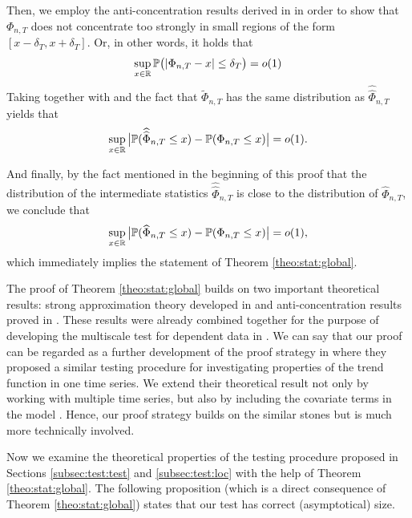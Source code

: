 \documentclass[a4paper,12pt]{article}
\makeatletter
\renewcommand{\eqref}[1]{\tagform@{\ref{#1}}}
\newcommand{\doublehattwo}[1]{\widehat{\widehat{#1}}}
\makeatother
\begin{document}
Then, we employ the anti-concentration results derived in \cite{Chernozhukov2015} in order to show that $\Phi_{n,T}$ does not concentrate too strongly in small regions of the form $[x-\delta_T,x+\delta_T]$. Or, in other words, it holds that 
\begin{align}\label{eq:proof2}
\sup_{x \in \mathbb{R}} \mathbb{P} \big( | \Phi_{n,T} - x | \le \delta_T \big) = o(1)
\end{align}
Taking \eqref{eq:proof1} together with \eqref{eq:proof2} and the fact that $\widetilde{\Phi}_{n, T}$ has the same distribution as $\doublehattwo{\Phi}_{n, T}$ yields that 
\begin{equation*}
\sup_{x \in \reals} \big| \pr(\doublehattwo{\Phi}_{n, T} \le x) - \pr(\Phi_{n,T} \le x) \big| = o(1). 
\end{equation*}
 
And finally, by the fact mentioned in the beginning of this proof that the distribution of the intermediate statistics $\doublehattwo{\Phi}_{n, T}$ is close to the distribution of $\widehat{\Phi}_{n, T}$, we conclude that 
\begin{equation*}
\sup_{x \in \mathbb{R}} \big| \mathbb{P}(\widehat{\Phi}_{n, T} \le x) - \mathbb{P}(\Phi_{n,T} \le x) \big| = o(1),
\end{equation*}
which immediately implies the statement of Theorem \ref{theo:stat:global}.

\begin{remark}
The proof of Theorem \ref{theo:stat:global} builds on two important theoretical results: strong approximation theory developed in \cite{BerkesLiuWu2014} and anti-concentration results proved in \cite{Chernozhukov2015}. These results were already combined together for the purpose of developing the multiscale test for dependent data in \cite{KhismatullinaVogt2020}. We can say that our proof can be regarded as a further development of the proof strategy in \cite{KhismatullinaVogt2020} where they proposed a similar testing procedure for investigating properties of the trend function in one time series. We extend their theoretical result not only by working with multiple time series, but also by including the covariate terms in the model \eqref{eq:model}. Hence, our proof strategy builds on the similar stones but is much more technically involved.
\end{remark}

Now we examine the theoretical properties of the testing procedure proposed in \linebreak Sections \ref{subsec:test:test} and \ref{subsec:test:loc} with the help of Theorem \ref{theo:stat:global}. The following proposition (which is a direct consequence of Theorem \ref{theo:stat:global}) states that our test has correct (asymptotical) size.
\end{document}
